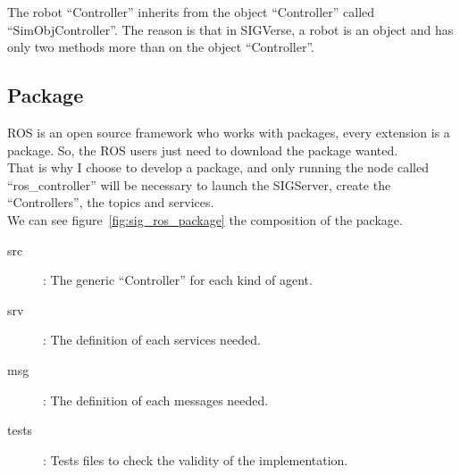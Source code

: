 The robot ``Controller'' inherits from the object ``Controller'' called ``SimObjController''. The reason is that in SIGVerse, a robot is an object and has only two methods more than on the object ``Controller''.\\

\subsection{Package}
ROS is an open source framework who works with packages, every extension is a package. So, the ROS users just need to download the package wanted.\\
That is why I choose to develop a package, and only running the node called ``ros\_controller'' will be necessary to launch the SIGServer, create the ``Controllers'', the topics and services.\\
We can see figure~\ref{fig:sig_ros_package} the composition of the package.
\begin{description}
	\item[src] : The generic ``Controller'' for each kind of agent.
	\item[srv] : The definition of each services needed.
	\item[msg] : The definition of each messages needed.
	\item[tests] : Tests files to check the validity of the implementation.
\end{description}

\noindent\begin{minipage}{\linewidth}%
\label{fig:sig_ros_package}%
\end{minipage}

